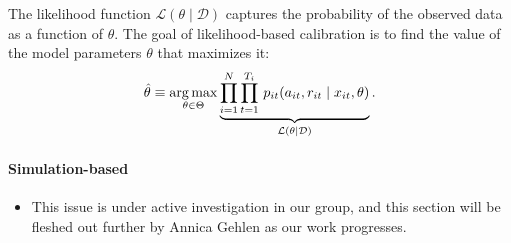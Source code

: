 \noindent The likelihood function $\mathcal{L}(\theta\mid\mathcal{D})$ captures the probability of the observed data as a function of $\theta$. The goal of likelihood-based calibration is to find the value of the model parameters $\theta$ that maximizes it:
%
\begin{align*}
  \hat{\theta} \equiv \operatorname*{arg\,max}_{\theta \in \Theta}  \underbrace{\prod^N_{i= 1} \prod^{T_i}_{t= 1}\, p_{it}(a_{it}, r_{it} \mid x_{it}, \theta)}_{\mathcal{L}(\theta\mid\mathcal{D})}.
\end{align*}

\paragraph{Simulation-based}

\begin{itemize}
  \item This issue is under active investigation in our group, and this section will be fleshed out further by Annica Gehlen as our work progresses.
\end{itemize}
